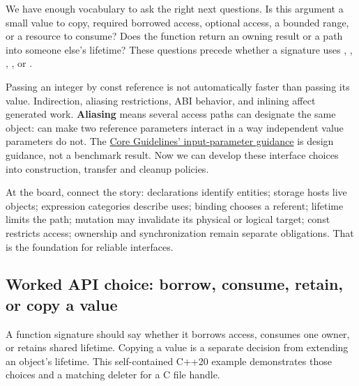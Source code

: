 \hypertarget{05-engine-i-ch003-choose-the-access-contract-before-the-parameter-syntax}{}

We have enough vocabulary to ask the right next questions. Is this argument a small value to copy, required borrowed access, optional access, a bounded range, or a resource to consume? Does the function return an owning result or a path into someone else's lifetime? These questions precede whether a signature uses , , , , or .

Passing an integer by const reference is not automatically faster than passing its value. Indirection, aliasing restrictions, ABI behavior, and inlining affect generated work. \textbf{Aliasing} means several access paths can designate the same object:  can make two reference parameters interact in a way independent value parameters do not. The \href{https://isocpp.github.io/CppCoreGuidelines/CppCoreGuidelines\#f16-for-in-parameters-pass-cheaply-copied-types-by-value-and-others-by-reference-to-const}{Core Guidelines' input-parameter guidance} is design guidance, not a benchmark result. Now we can develop these interface choices into construction, transfer and cleanup policies.

At the board, connect the story: declarations identify entities; storage hosts live objects; expression categories describe uses; binding chooses a referent; lifetime limits the path; mutation may invalidate its physical or logical target; const restricts access; ownership and synchronization remain separate obligations. That is the foundation for reliable interfaces.

\subsection{Worked API choice: borrow, consume, retain, or copy a value}\label{05-engine-i-ch003-worked-api-choice-borrow-consume-retain-or-copy-a-value}

\hypertarget{05-engine-i-ch003-worked-api-choice-borrow-consume-retain-or-copy-a-value}{}

A function signature should say whether it borrows access, consumes one owner, or retains shared lifetime. Copying a value is a separate decision from extending an object's lifetime. This self-contained C++20 example demonstrates those choices and a matching deleter for a C file handle.

